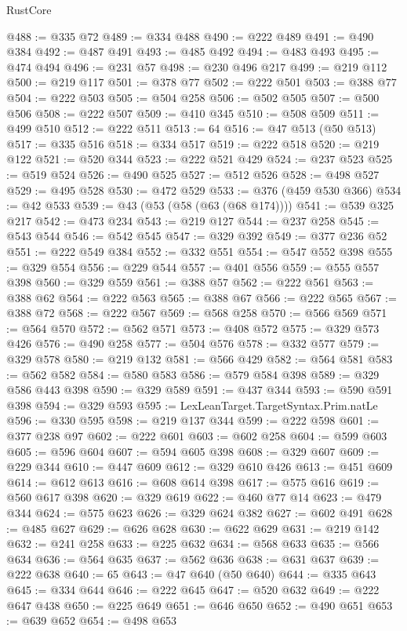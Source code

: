 \begin{lexlean}{RustCore}
\begin{coremodule}
@488 := @335 @72
@489 := @334 @488
@490 := @222 @489
@491 := @490 @384
@492 := @487 @491
@493 := @485 @492
@494 := @483 @493
@495 := @474 @494
@496 := @231 @57
@498 := @230 @496 @217
@499 := @219 @112
@500 := @219 @117
@501 := @378 @77
@502 := @222 @501
@503 := @388 @77
@504 := @222 @503
@505 := @504 @258
@506 := @502 @505
@507 := @500 @506
@508 := @222 @507
@509 := @410 @345
@510 := @508 @509
@511 := @499 @510
@512 := @222 @511
@513 := 64
@516 := @47 @513 (@50 @513)
@517 := @335 @516
@518 := @334 @517
@519 := @222 @518
@520 := @219 @122
@521 := @520 @344
@523 := @222 @521 @429
@524 := @237 @523
@525 := @519 @524
@526 := @490 @525
@527 := @512 @526
@528 := @498 @527
@529 := @495 @528
@530 := @472 @529
@533 := @376 (@459 @530 @366)
@534 := @42 @533
@539 := @43 (@53 (@58 (@63 (@68 @174))))
@541 := @539 @325 @217
@542 := @473 @234
@543 := @219 @127
@544 := @237 @258
@545 := @543 @544
@546 := @542 @545
@547 := @329 @392
@549 := @377 @236 @52
@551 := @222 @549 @384
@552 := @332 @551
@554 := @547 @552 @398
@555 := @329 @554
@556 := @229 @544
@557 := @401 @556
@559 := @555 @557 @398
@560 := @329 @559
@561 := @388 @57
@562 := @222 @561
@563 := @388 @62
@564 := @222 @563
@565 := @388 @67
@566 := @222 @565
@567 := @388 @72
@568 := @222 @567
@569 := @568 @258
@570 := @566 @569
@571 := @564 @570
@572 := @562 @571
@573 := @408 @572
@575 := @329 @573 @426
@576 := @490 @258
@577 := @504 @576
@578 := @332 @577
@579 := @329 @578
@580 := @219 @132
@581 := @566 @429
@582 := @564 @581
@583 := @562 @582
@584 := @580 @583
@586 := @579 @584 @398
@589 := @329 @586 @443 @398
@590 := @329 @589
@591 := @437 @344
@593 := @590 @591 @398
@594 := @329 @593
@595 := LexLeanTarget.TargetSyntax.Prim.natLe
@596 := @330 @595
@598 := @219 @137 @344
@599 := @222 @598
@601 := @377 @238 @97
@602 := @222 @601
@603 := @602 @258
@604 := @599 @603
@605 := @596 @604
@607 := @594 @605 @398
@608 := @329 @607
@609 := @229 @344
@610 := @447 @609
@612 := @329 @610 @426
@613 := @451 @609
@614 := @612 @613
@616 := @608 @614 @398
@617 := @575 @616
@619 := @560 @617 @398
@620 := @329 @619
@622 := @460 @77 @14
@623 := @479 @344
@624 := @575 @623
@626 := @329 @624 @382
@627 := @602 @491
@628 := @485 @627
@629 := @626 @628
@630 := @622 @629
@631 := @219 @142
@632 := @241 @258
@633 := @225 @632
@634 := @568 @633
@635 := @566 @634
@636 := @564 @635
@637 := @562 @636
@638 := @631 @637
@639 := @222 @638
@640 := 65
@643 := @47 @640 (@50 @640)
@644 := @335 @643
@645 := @334 @644
@646 := @222 @645
@647 := @520 @632
@649 := @222 @647 @438
@650 := @225 @649
@651 := @646 @650
@652 := @490 @651
@653 := @639 @652
@654 := @498 @653

\end{coremodule}
\end{lexlean}
